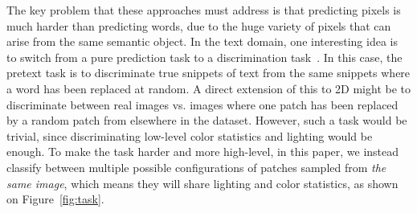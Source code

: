 \documentclass[10pt,twocolumn,letterpaper]{article}
\begin{document}
The key problem that these approaches must address is that predicting pixels is much harder than predicting words, due to the huge variety of pixels that can arise from the same semantic object. In the text domain, one 
interesting idea is to switch from a pure prediction task to a discrimination task~\cite{tsujiiythu2007discriminative,collobert2008unified}. 
In this case, the pretext task is to discriminate true snippets of text from the same snippets where a word has been replaced at random.  
A direct extension of this to 2D might be to discriminate between real images vs. images where one patch has been replaced by a random patch from elsewhere in the dataset. 
However, such a task would be trivial, since discriminating low-level color statistics and lighting would be enough.  To make the task harder and more high-level,
in this paper, we instead classify between multiple possible configurations of patches sampled from {\em the same image}, which means they will share lighting and color statistics, as shown on Figure~\ref{fig:task}.





\end{document}
